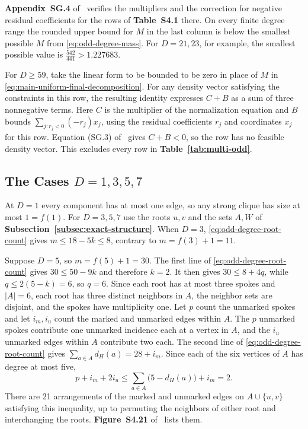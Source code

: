 \documentclass[preprint,11pt,numbers]{elsarticle-arxiv}
\numberwithin{equation}{section}
\theoremstyle{definition}
\begin{document}
\textbf{Appendix~SG.4} of~\cite{FGSTSupplement}
verifies the multipliers and the correction for negative residual
coefficients for the rows of \textbf{Table~S4.1} there.
On every finite degree range the
rounded upper bound for $M$ in the last column is below the
smallest possible $M$ from \eqref{eq:odd-degree-mass}. For
$D=21,23$, for example, the smallest possible value is
$\frac{542}{441}>1.227683$.

For $D\geq59$, take the linear form to be bounded to be zero
in place of $M$ in \eqref{eq:main-uniform-final-decomposition}.
For any density vector satisfying the constraints in this row,
the resulting identity expresses $C+B$ as a sum of three
nonnegative terms. Here $C$ is the multiplier of the normalization
equation and $B$ bounds $\sum_{j:r_j<0}(-r_j)x_j$, using the
residual coefficients $r_j$ and coordinates $x_j$ for this row.
Equation (SG.3) of~\cite{FGSTSupplement} gives $C+B<0$,
so the row has no feasible density vector. This excludes
every row in \textbf{Table~\ref{tab:multi-odd}}.

\subsection{The Cases \texorpdfstring{$D=1,3,5,7$}{D = 1, 3, 5, 7}}
\label{subsec:exact-small-degree}

At $D=1$ every component has at most one edge, so any strong
clique has size at most $1=f(1)$. For $D=3,5,7$ use the roots
$u,v$ and the sets $A,W$ of
\textbf{Subsection~\ref{subsec:exact-structure}}. When $D=3$,
\eqref{eq:odd-degree-root-count} gives $m\leq18-5k\leq8$,
contrary to $m=f(3)+1=11$.

Suppose $D=5$, so $m=f(5)+1=30$. The first line of
\eqref{eq:odd-degree-root-count} gives $30\leq50-9k$ and
therefore $k=2$. It then gives $30\leq8+4q$, while
$q\leq2(5-k)=6$, so $q=6$. Since each root has at most
three spokes and $|A|=6$, each root has three distinct neighbors
in $A$, the neighbor sets are disjoint, and the spokes have
multiplicity one. Let $p$ count the unmarked spokes and let
$i_m,i_u$ count the marked and unmarked edges within $A$.
The $p$ unmarked spokes contribute one unmarked incidence each
at a vertex in $A$, and the $i_u$ unmarked edges within $A$
contribute two each.
The second line of \eqref{eq:odd-degree-root-count} gives
$\sum_{a\in A}d_H(a)=28+i_m$. Since each of the six vertices
of $A$ has degree at most five,
\[
 p+i_m+2i_u \leq
 \sum_{a\in A}\bigl(5-d_H(a)\bigr)+i_m=2.
\]
There are 21 arrangements of the marked and unmarked edges on
$A\cup\{u,v\}$ satisfying this inequality, up to permuting the
neighbors of either root and interchanging the roots.
\textbf{Figure~S4.21} of~\cite{FGSTSupplement}
lists them.
\end{document}
